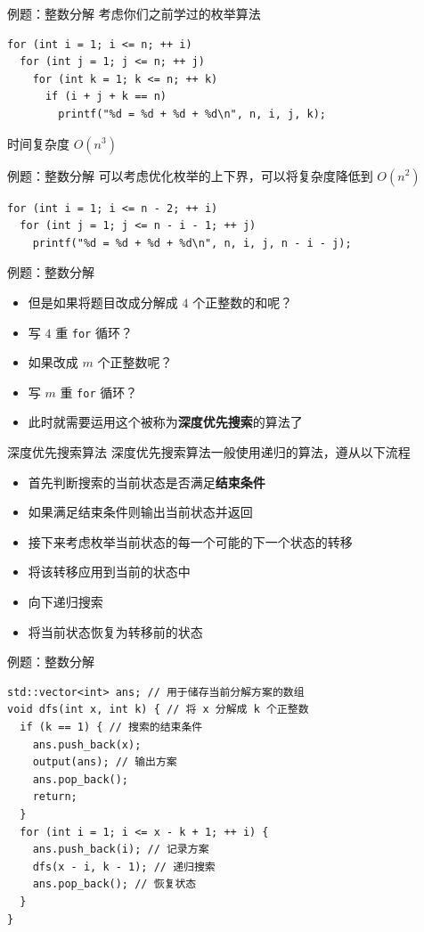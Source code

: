 \documentclass[12pt,aspectratio=169]{beamer}
\begin{document}
\begin{frame}[fragile]{例题：整数分解}
  考虑你们之前学过的枚举算法
  \begin{verbatim}
for (int i = 1; i <= n; ++ i)
  for (int j = 1; j <= n; ++ j)
    for (int k = 1; k <= n; ++ k)
      if (i + j + k == n)
        printf("%d = %d + %d + %d\n", n, i, j, k);
  \end{verbatim}
  \pause
  时间复杂度 $O(n^3)$
\end{frame}

\begin{frame}[fragile]{例题：整数分解}
  可以考虑优化枚举的上下界，可以将复杂度降低到 $O(n^2)$
  \begin{verbatim}
for (int i = 1; i <= n - 2; ++ i)
  for (int j = 1; j <= n - i - 1; ++ j)
    printf("%d = %d + %d + %d\n", n, i, j, n - i - j);
  \end{verbatim}
\end{frame}

\begin{frame}[fragile]{例题：整数分解}
  \begin{itemize}
    \item 但是如果将题目改成分解成 $4$ 个正整数的和呢？\pause
    \item 写 $4$ 重 \verb|for| 循环？\pause
    \item 如果改成 $m$ 个正整数呢？\pause
    \item 写 $m$ 重 \verb|for| 循环？\pause
    \item 此时就需要运用这个被称为\textbf{深度优先搜索}的算法了
  \end{itemize}
\end{frame}

\begin{frame}[fragile]{深度优先搜索算法}
  深度优先搜索算法一般使用递归的算法，遵从以下流程
  \begin{itemize}
    \item 首先判断搜索的当前状态是否满足\textbf{结束条件}
    \item 如果满足结束条件则输出当前状态并返回
    \item 接下来考虑枚举当前状态的每一个可能的下一个状态的转移
    \item 将该转移应用到当前的状态中
    \item 向下递归搜索
    \item 将当前状态恢复为转移前的状态
  \end{itemize}
\end{frame}

\begin{frame}[fragile]{例题：整数分解}
  \begin{verbatim}
std::vector<int> ans; // 用于储存当前分解方案的数组
void dfs(int x, int k) { // 将 x 分解成 k 个正整数
  if (k == 1) { // 搜索的结束条件
    ans.push_back(x);
    output(ans); // 输出方案
    ans.pop_back();
    return;
  }
  for (int i = 1; i <= x - k + 1; ++ i) {
    ans.push_back(i); // 记录方案
    dfs(x - i, k - 1); // 递归搜索
    ans.pop_back(); // 恢复状态
  }
}
  \end{verbatim}
\end{frame}
\end{document}
